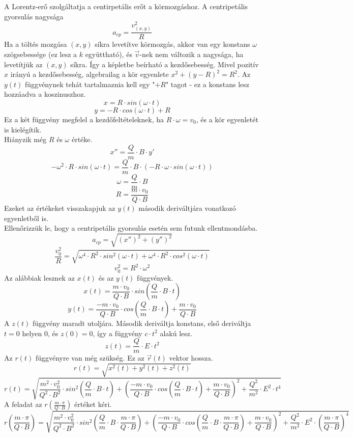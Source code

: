 \documentclass[11pt,a4paper,openany,leqno]{article}
\begin{document}
A Lorentz-erő szolgáltatja a centirpetális erőt a körmozgáshoz. A centripetális gyorsulás nagysága\\ 
$$ a_{cp} = \frac{v_{(x,y)}^2}{R} $$\indent
Ha a töltés mozgása $(x,y)$ síkra levetítve körmozgás, akkor van egy konstans $\omega$ szögsebessége (ez lesz a $k$ együttható), és $\vec{v}$-nek nem változik a nagysága, ha levetítjük az $(x,y)$ síkra. Így a képletbe beírható a kezdősebesség. Mivel pozitív $x$ irányú a kezdősebesség, algebrailag a kör egyenlete $x^2 + (y-R)^2 = R^2$. Az $y(t)$ függvénynek tehát tartalmaznia kell egy "$+R$" tagot - ez a konstans lesz hozzáadva a koszinuszhoz.\\ 
$$ x=R\cdot sin(\omega \cdot t) $$
$$ y=-R\cdot cos(\omega \cdot t) + R $$\indent
Ez a két függvény megfelel a kezdőfeltételeknek, ha $R \cdot \omega = v_0$, és a kör egyenletét is kielégítik.\\ \indent
Hiányzik még $R$ és $\omega$ értéke.\\
$$ x'' = \frac{Q}{m}\cdot B \cdot  y' $$
$$ -\omega^2 \cdot R\cdot sin(\omega \cdot t) = \frac{Q}{m}\cdot B \cdot (-R \cdot \omega \cdot sin(\omega \cdot t))  $$
$$ \omega = \frac{Q}{m}\cdot B $$
$$ R = \frac{m\cdot v_0}{Q\cdot B} $$ \indent
Ezeket az értékeket visszakapjuk az $y(t)$ második deriváltjára vonatkozó egyenletből is.\\ \indent
Ellenőrizzük le, hogy a centripetális gyorsulás esetén sem futunk ellentmondásba.\\ 
$$ a_{cp} = \sqrt{(x'')^2 + (y'')^2} $$
$$ \frac{v_0^2}{R} = \sqrt{\omega^4 \cdot R^2 \cdot sin^2(\omega \cdot t) + \omega^4 \cdot R^2\cdot cos^2(\omega \cdot t)} $$
$$ v_0^2 = R^2 \cdot \omega^2 $$ \indent
Az alábbiak lesznek az $x(t)$ és az $y(t)$ függvények.
$$ x(t) = \frac{m\cdot v_0}{Q\cdot B}\cdot sin(\frac{Q}{m}\cdot B \cdot t) $$
$$ y(t) = \frac{- m\cdot v_0}{Q\cdot B} \cdot cos(\frac{Q}{m}\cdot B \cdot t) + \frac{m\cdot v_0}{Q\cdot B} $$ \indent
A $z(t)$ függvény maradt utoljára. Második deriváltja konstans, első deriváltja $t=0$ helyen $0$, és $z(0)=0$, így a függvény $c\cdot t^2$ alakú lesz. \\
$$ z(t) = \frac{Q}{m}\cdot E \cdot t^2 $$  \indent
Az $r(t)$ függvényre van még szükség. Ez az $\vec{r}(t)$ vektor hossza.\\
$$ r(t) = \sqrt{x^2(t) + y^2(t) + z^2(t)} $$
$$ r(t) = \sqrt{\frac{m^2\cdot v_0^2}{Q^2\cdot B^2}\cdot sin^2(\frac{Q}{m}\cdot B \cdot t) + (\frac{- m\cdot v_0}{Q\cdot B} \cdot cos(\frac{Q}{m}\cdot B \cdot t) + \frac{m\cdot v_0}{Q\cdot B})^2 + \frac{Q^2}{m^2}\cdot E^2 \cdot t^4} $$ \indent
A feladat az $r(\frac{m \cdot \pi}{Q \cdot B})$ értéket kéri.\\
$$ r(\frac{m \cdot \pi}{Q \cdot B}) = \sqrt{\frac{m^2\cdot v_0^2}{Q^2\cdot B^2}\cdot sin^2(\frac{Q}{m}\cdot B \cdot \frac{m \cdot \pi}{Q \cdot B}) + (\frac{- m\cdot v_0}{Q\cdot B} \cdot cos(\frac{Q}{m}\cdot B \cdot \frac{m \cdot \pi}{Q \cdot B}) + \frac{m\cdot v_0}{Q\cdot B})^2 + \frac{Q^2}{m^2}\cdot E^2 \cdot (\frac{m \cdot \pi}{Q \cdot B})^4} $$
\end{document}

